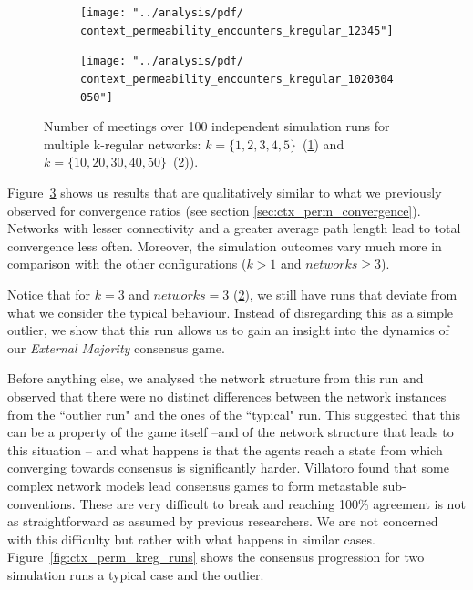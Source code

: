 \documentclass[preprint,number]{elsarticle}
\begin{document}
\begin{figure}[H]
	\centering
	\begin{subfigure}{.49\linewidth}
		\centering
		\texttt{[image: "../analysis/pdf/ context\_permeability\_encounters\_kregular\_12345"]}
		\caption{}
		\label{fig:ctx_perm_kreg_12345}
	\end{subfigure}%
	\begin{subfigure}{.49\linewidth}
		\centering
		\texttt{[image: "../analysis/pdf/ context\_permeability\_encounters\_kregular\_1020304050"]}
		\caption{}
		\label{fig:ctx_perm_kreg_1020304050}
	\end{subfigure}
	\begin{minipage}{0.9\linewidth}
		\vspace{0.2cm}
		\caption{Number of meetings over 100 independent simulation runs for multiple k-regular networks: $k=\{1,2,3,4,5\}$~(\ref{fig:ctx_perm_kreg_12345}) and $k=\{10,20,30,40,50\}$~(\ref{fig:ctx_perm_kreg_1020304050})).}
		\label{fig:ctx_perm_kreg}
	\end{minipage}
\end{figure}

\noindent Figure~\ref{fig:ctx_perm_kreg} shows us results that are qualitatively similar to what we previously observed for convergence ratios (see section \ref{sec:ctx_perm_convergence}). Networks with lesser connectivity and a greater average path length lead to total convergence less often. Moreover, the simulation outcomes vary much more in comparison with the other configurations ($k>1$ and $networks \ge 3$).

Notice that for $k=3$ and $networks=3$ (\ref{fig:ctx_perm_kreg_1020304050}), we still have runs that deviate from what we consider the typical behaviour. Instead of disregarding this as a simple outlier, we show that this run allows us to gain an insight into the dynamics of our \textit{External Majority} consensus game.

Before anything else, we analysed the network structure from this run and observed that there were no distinct differences between the network instances from the ``outlier run" and the ones of the ``typical" run. This suggested that this can be a property of the game itself --and of the network structure that leads to this situation -- and what happens is that the agents reach a state from which converging towards consensus is significantly harder. Villatoro \cite{Villatoro2013}  found that some complex network models lead consensus games to form metastable sub-conventions. These are very difficult to break and reaching 100\% agreement is not as straightforward as assumed by previous researchers. We are not concerned with this difficulty but rather with what happens in similar cases. Figure~\ref{fig:ctx_perm_kreg_runs} shows the consensus progression for two simulation runs a typical case and the outlier.
\end{document}
